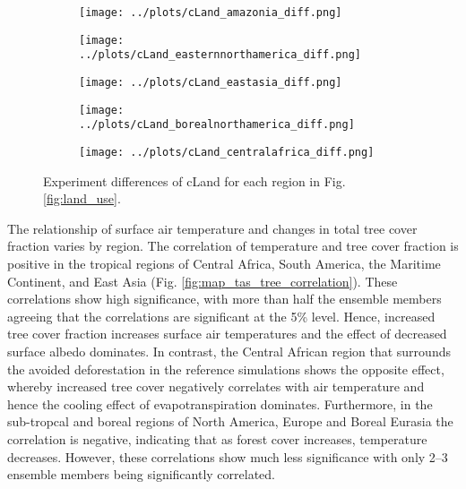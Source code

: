 \documentclass[]{article}
\begin{document}
\begin{figure}[H]
    \centering
    \begin{subfigure}[b]{0.4\linewidth}
        \texttt{[image: ../plots/cLand\_amazonia\_diff.png]}
    \end{subfigure}

    \begin{subfigure}[b]{0.4\linewidth}
        \texttt{[image: ../plots/cLand\_easternnorthamerica\_diff.png]}
    \end{subfigure}
    \begin{subfigure}[b]{0.4\linewidth}
        \texttt{[image: ../plots/cLand\_eastasia\_diff.png]}
    \end{subfigure}
    \begin{subfigure}[b]{0.4\linewidth}
        \texttt{[image: ../plots/cLand\_borealnorthamerica\_diff.png]}
    \end{subfigure}
    \begin{subfigure}[b]{0.4\linewidth}
        \texttt{[image: ../plots/cLand\_centralafrica\_diff.png]}
    \end{subfigure}
    \caption{Experiment differences of cLand for each region in Fig. \ref{fig:land_use}.}
    \label{fig:accesss_regional_cland}
\end{figure}

The relationship of surface air temperature and changes in total tree cover fraction varies by region.
The correlation of temperature and tree cover fraction is positive in the tropical regions of Central Africa, South America, the Maritime Continent, and East Asia (Fig. \ref{fig:map_tas_tree_correlation}).
These correlations show high significance, with more than half the ensemble members agreeing that the correlations are significant at the 5\% level.
Hence, increased tree cover fraction increases surface air temperatures and the effect of decreased surface albedo dominates.
In contrast, the Central African region that surrounds the avoided deforestation in the reference simulations shows the opposite effect, whereby increased tree cover negatively correlates with air temperature and hence the cooling effect of evapotranspiration dominates.
Furthermore, in the sub-tropcal and boreal regions of North America, Europe and Boreal Eurasia the correlation is negative, indicating that as forest cover increases, temperature decreases.
However, these correlations show much less significance with only 2--3 ensemble members being significantly correlated.
\end{document}
